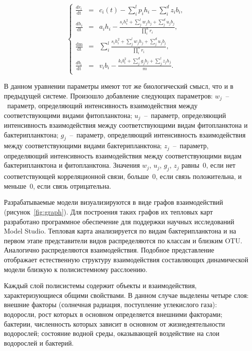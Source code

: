 \documentclass[a4paper,12pt,openany,final]{extreport}
\begin{document}
\begin{equation}
 \left\{ \begin{array}{lcl}
\frac{dr_{i}}{\text{dt}} &=& c_{i}\left( t \right) - \sum_{i}^{l}{p_{i}h_{i}} - \sum_{i}^{d}{z_{i}b_{i}},\\
\frac{dh_{i}}{\text{dt}} &=& a_{i}h_{i} - \frac{s_{i}h_{i}^{2} + \sum_{j}^{l}{w_{j}h_{j} + \sum_{j}^{d}{u_{j}b_{j}}}}{\prod_{i}^{n}r_{i}},\\
\frac{\text{dm}}{\text{dt}} &=& \sum_{i}^{l}\frac{s_{i}h_{i}^{2} + \sum_{j}^{l}{w_{j}h_{j} + \sum_{j}^{d}{u_{j}b_{j}}}}{\prod_{i}^{n}r_{i}},\\
\frac{db_{i}}{\text{dt}} &=& v_{i}b_{i} - \frac{k_{i}b_{i}^{2} + \sum_{j}^{d}{g_{j}b_{j} + \sum_{j}^{l}{z_{j}h_{j}}}}{m}.\\
\end{array} \right.
  \label{eq:four-comp-sys-spec}
\end{equation}

В данном уравнении параметры имеют тот же биологический смысл, что и в предыдущей системе. Произошло добавление следующих параметров: \(w_{j}\)~--~параметр, определяющий интенсивность взаимодействия между соответствующими видами фитопланктона; \(u_{j}\)~--~параметр, определяющий интенсивность взаимодействия между соответствующими видам фитопланктона и бактерипланктона; \(g_{j}\)~--~параметр, определяющий интенсивность взаимодействия между соответствующими видами бактерипланктона; \(z_{j}\)~--~параметр, определяющий интенсивность взаимодействия между соответствующими видам бактерипланктона и фитопланктона. Значения \(w_{j}\), \(u_{j}\), \(g_{j}\), \(z_{j}\) равны~0, если нет соответствующей корреляционной связи, больше~0, если связь положительна, и меньше~0, если связь отрицательна.

Разрабатываемые модели визуализируются в виде графов взаимодействий (рисунок~\ref{fig:graph}). Для построения таких графов их тепловых карт разработано программное обеспечение для поддержки научных исследований Model Studio.  Тепловая карта анализируется по видам бактерипланктона и на первом этапе представители видов распределяются по классам и близким OTU. Аналогично распределяются взаимодействия. Подобное представление отображает естественную структуру взаимодействия составляющих динамической модели близкую к полисистемному расслоению.

Каждый слой полисистемы содержит объекты и взаимодействия, характеризующиеся общими свойствами. В данном случае выделены четыре слоя: внешние факторы (солнечная радиация, поступление углекислого газа): водоросли, рост которых в основном определяется внешними факторами; бактерии, численность которых зависит в основном от жизнедеятельности водорослей; состояние водной среды, оказывающей воздействие на слои водорослей и бактерий.
\end{document}
